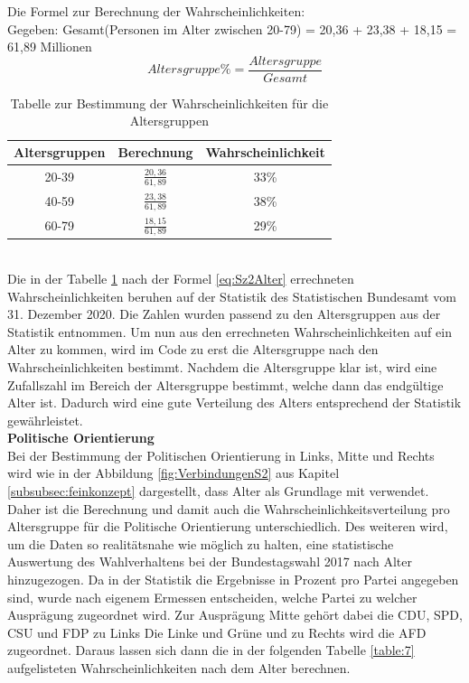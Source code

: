\begin{onehalfspace}
Die Formel zur Berechnung der Wahrscheinlichkeiten:\\
Gegeben: Gesamt(Personen im Alter zwischen 20-79) = 20,36 + 23,38 + 18,15 = 61,89 Millionen\\
\begin{equation}
    Altersgruppe\% = \frac{Altersgruppe}{Gesamt}\label{eq:Sz2Alter}
\end{equation}
\begin{table}[!h]
    \centering
    \begin{tabular}{|c|c|c|}
    \hline
    \textbf{Altersgruppen} & \textbf{Berechnung} & \textbf{Wahrscheinlichkeit} \\ \hline
    20-39                  & \rule{0pt}{18pt} $\frac{20,36}{61,89}$ & 33\%   \\[8pt] \hline
    40-59                  & \rule{0pt}{18pt} $\frac{23,38}{61,89}$ & 38\%  \\[8pt] \hline
    60-79                  & \rule{0pt}{18pt} $\frac{18,15}{61,89}$ & 29\%   \\[8pt] \hline
    \end{tabular}
    \caption{Tabelle zur Bestimmung der Wahrscheinlichkeiten für die Altersgruppen}
    \label{table:6}
\end{table}\\
Die in der Tabelle \ref{table:6} nach der Formel \ref{eq:Sz2Alter} errechneten Wahrscheinlichkeiten beruhen auf der Statistik des Statistischen Bundesamt vom 31. Dezember 2020.\cite{statista2020} Die Zahlen wurden passend zu den Altersgruppen aus der Statistik entnommen. Um nun aus den errechneten Wahrscheinlichkeiten auf ein Alter zu kommen, wird im Code zu erst die Altersgruppe nach den Wahrscheinlichkeiten bestimmt. Nachdem die Altersgruppe klar ist, wird eine Zufallszahl im Bereich der Altersgruppe bestimmt, welche dann das endgültige Alter ist. Dadurch wird eine gute Verteilung des Alters entsprechend der Statistik gewährleistet.\\
\textbf{Politische Orientierung}\\
Bei der Bestimmung der Politischen Orientierung in Links, Mitte und Rechts wird wie in der Abbildung \ref{fig:VerbindungenS2} aus Kapitel \ref{subsubsec:feinkonzept} dargestellt, dass Alter als Grundlage mit verwendet. Daher ist die Berechnung und damit auch die Wahrscheinlichkeitsverteilung pro Altersgruppe für die Politische Orientierung unterschiedlich. Des weiteren wird, um die Daten so realitätsnahe wie möglich zu halten, eine statistische Auswertung des Wahlverhaltens bei der Bundestagswahl 2017 nach Alter hinzugezogen. Da in der Statistik die Ergebnisse in Prozent pro Partei angegeben sind, wurde nach eigenem Ermessen entscheiden, welche Partei zu welcher Ausprägung zugeordnet wird. Zur Ausprägung Mitte gehört dabei die CDU, SPD, CSU und FDP zu Links Die Linke und Grüne und zu Rechts wird die AFD zugeordnet. Daraus lassen sich dann die in der folgenden Tabelle \ref{table:7} aufgelisteten Wahrscheinlichkeiten nach dem Alter berechnen.\cite[S. 33]{konrad-adenauer-stiftung2021}\\

\end{onehalfspace}
